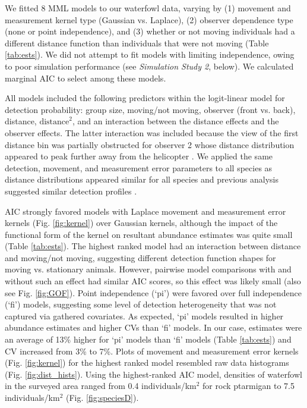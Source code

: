 \documentclass[aoas,preprint]{imsart}
\numberwithin{equation}{section}
\theoremstyle{plain}
\begin{document}
We fitted 8 MML models to our waterfowl data, varying by (1) movement and measurement kernel type (Gaussian vs. Laplace), (2) observer dependence type (none or point independence), and (3) whether or not moving individuals had a different distance function than individuals that were not moving (Table \ref{tab:ests}).  We did not attempt to fit models with limiting independence, owing to poor simulation performance (see \textit{Simulation Study 2}, below). We calculated marginal AIC to select among these models.

All models included the following predictors within the logit-linear model for detection probability: group size, moving/not moving, observer (front vs. back), distance, $\text{distance}^2$, and an interaction between the distance effects and the observer effects.  The latter interaction was included because the view of the first distance bin was partially obstructed for observer 2 whose distance distribution appeared to peak further away from the helicopter \citep[see][]{AlisauskasConn2017}.  We applied the same detection, movement, and measurement error parameters to all species as distance distributions appeared similar for all species and previous analysis suggested similar detection profiles \citep{AlisauskasConn2017}.

AIC strongly favored models with Laplace movement and measurement error kernels (Fig. \ref{fig:kernel}) over Gaussian kernels, although the impact of the functional form of the kernel on resultant abundance estimates was quite small (Table \ref{tab:ests}).  The highest ranked model had an interaction between distance and moving/not moving, suggesting different detection function shapes for moving vs. stationary animals. However, pairwise model comparisons with and without such an effect had similar AIC scores, so this effect was likely small (also see Fig. \ref{fig:GOF}). Point independence (`pi') were favored over full independence (`fi') models, suggesting some level of detection heterogeneity that was not captured via gathered covariates.  As expected, `pi' models resulted in higher abundance estimates and higher CVs than `fi' models. In our case, estimates were an average of 13\% higher for `pi' models than `fi' models (Table \ref{tab:ests}) and CV increased from 3\% to 7\%.  Plots of movement and measurement error kernels (Fig. \ref{fig:kernel}) for the highest ranked model resembled raw data histograms (Fig. \ref{fig:dist_hists}).  Using the highest-ranked AIC model, densities of waterfowl in the surveyed area ranged from 0.4 individuals/km$^2$ for rock ptarmigan to 7.5 individuals/km$^2$ (Fig. \ref{fig:speciesD}).
\end{document}
